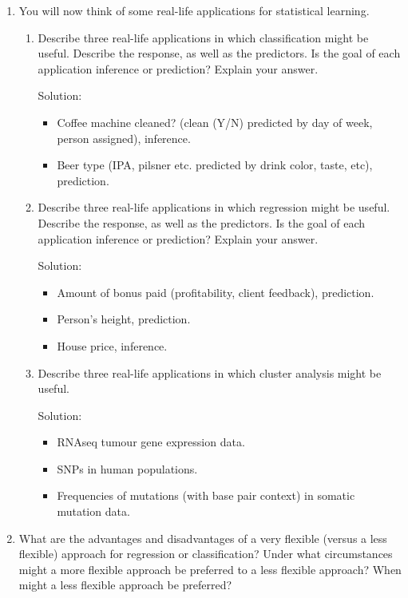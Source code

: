\documentclass{article}
\begin{document}
\begin{enumerate}
\item You will now think of some real-life applications for statistical learning.
\begin{enumerate}
\item Describe three real-life applications in which classification might
    be useful. Describe the response, as well as the predictors. Is the goal of
    each application inference or prediction? Explain your answer.

Solution:
\begin{itemize}
\item Coffee machine cleaned? (clean (Y/N) predicted by day of week, person assigned), inference.
\item Beer type (IPA, pilsner etc. predicted by drink color, taste, etc), prediction.
\end{itemize}

\item Describe three real-life applications in which regression might be
    useful. Describe the response, as well as the predictors. Is the goal of
    each application inference or prediction? Explain your answer.

Solution:
\begin{itemize}
\item Amount of bonus paid (profitability, client feedback), prediction.
\item Person's height, prediction.
\item House price, inference.
\end{itemize}

\item Describe three real-life applications in which cluster analysis might be
    useful.

Solution:
\begin{itemize}
\item RNAseq tumour gene expression data.
\item SNPs in human populations.
\item Frequencies of mutations (with base pair context) in somatic mutation data.
\end{itemize}
\end{enumerate}

\item What are the advantages and disadvantages of a very flexible (versus a less
flexible) approach for regression or classification? Under what circumstances
 might a more flexible approach be preferred to a less flexible approach? When
 might a less flexible approach be preferred?


\end{enumerate}
\end{document}
